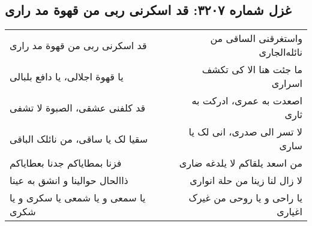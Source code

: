 \begin{center}
\section*{غزل شماره ۳۲۰۷: قد اسکرنی ربی من قهوة مد راری}
\label{sec:3207}
\begin{longtable}{l p{0.5cm} r}
قد اسکرنی ربی من قهوة مد راری
&&
واستغرقنی الساقی من نائله‌الجاری
\\
یا قهوة اجلالی، یا دافع بلبالی
&&
ما جئت هنا الا کی تکشف اسراری
\\
قد کلفنی عشقی، الصبوة لا تشفی
&&
اصعدت به عمری، ادرکت به ثاری
\\
سقیا لک یا ساقی، من نائلک الباقی
&&
لا تسر الی صدری، انی لک یا ساری
\\
فزنا بمطایاکم جدنا بعطایاکم
&&
من اسعد یلقاکم لا یلدغه ضاری
\\
ذاالحال حوالینا و انشق به عینا
&&
لا زال لنا زینا من حلة انواری
\\
یا سمعی و یا شمعی یا سکری و یا شکری
&&
یا راحی و یا روحی من غیرک اغیاری
\\
\end{longtable}
\end{center}

